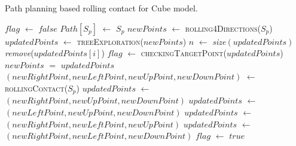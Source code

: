 \begin{algorithm}
\caption{Path planning based rolling contact for Cube model.\label{alg:rollingPath}}
\begin{algorithmic}[1]
               
	\State $flag$ $\leftarrow$ $false$
	\State $Path[S_p]$ $\leftarrow$ $S_p$
	\State $newPoints$ $\leftarrow$ \textsc{rolling4Directions}($S_p$)	
		\State $updatedPoints$ $\leftarrow$ \textsc{treeExploration}($newPoints$)	
		\State $n$ $\leftarrow$ \textit{size}$(updatedPoints)$
					\State \textit{remove}($updatedPoints[i]$)
				\EndIf
			\EndFor
		\EndFor		
		\State $flag$ $\leftarrow$ \textsc{checkingTargetPoint}($updatedPoints$) 	  	
				\State {} 								    
			\EndIf
			\State $newPoints$ $=$ $updatedPoints$ 
	\EndWhile
	\State  {} 	
\EndProcedure
{}
	\State $(newRightPoint,newLeftPoint,newUpPoint,newDownPoint)$ $\leftarrow$ \textsc{rollingContact}($S_p$)				
	\State {}
\EndProcedure
{}
		\State  $updatedPoints$ $\leftarrow$  $(newRightPoint,newUpPoint,newDownPoint)$
		\State $updatedPoints$ $\leftarrow$  $(newLeftPoint,newUpPoint,newDownPoint)$
		\State $updatedPoints$ $\leftarrow$  $(newRightPoint,newLeftPoint,newUpPoint)$
	\Else %
		\State $updatedPoints$ $\leftarrow$  $(newRightPoint,newLeftPoint,newDownPoint)$
	\EndIf
	\State {}
\EndProcedure
{}
										
		\State $flag$ $\leftarrow$ $true$
	\EndIf
	\State {}
\EndProcedure
\end{algorithmic}
\end{algorithm}


\newpage
